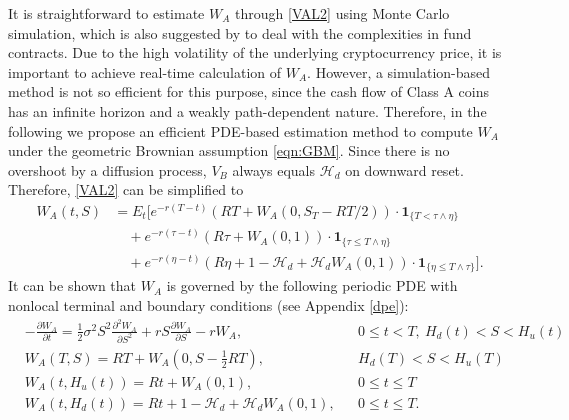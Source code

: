 \documentclass[11pt]{article}%
\numberwithin{equation}{section}
\theoremstyle{plain}
\begin{document}
 It is straightforward to estimate $W_A$ through \eqref{VAL2} using Monte Carlo simulation, which is also suggested by \cite{adams_risk_2006} to deal with the complexities in fund contracts. Due to the high volatility of the underlying cryptocurrency price, it is important to achieve real-time calculation of $W_A$. However, a simulation-based method is not so efficient for this purpose, since the cash flow of Class A coins has an infinite horizon and a weakly path-dependent nature. Therefore, in the following we propose an efficient PDE-based estimation method to compute $W_A$ under the geometric Brownian assumption \eqref{eqn:GBM}. Since there is no overshoot by a diffusion process, $V_B$ always equals $\mathcal{H}_d$ on downward reset. Therefore, \eqref{VAL2} can be simplified to
\begin{align} \nonumber
W_{A}(t,S) & =E_{t}\Bigg[e^{-r(T-t)}(RT+W_A(0,S_T-RT/2))\cdot\mathbf{1}_{\{T<\tau\land\eta\}}\\ \label{srep0}
&\quad+e^{-r(\tau-t)}(R\tau+W_{A}(0,1))\cdot\mathbf{1}_{\{\tau\le T\land\eta\}}\\
 & \quad+e^{-r(\eta-t)}(R\eta+1-\mathcal{H}_d+\mathcal{H}_d W_{A}(0,1))\cdot\mathbf{1}_{\{\eta\le T\land\tau\}}\Bigg]. \nonumber
\end{align}
It can be shown that $W_{A}$ is governed by the following periodic PDE with nonlocal terminal and boundary conditions (see Appendix \ref{dpe}):
\begin{align}\label{eqn:PDEstart}
&-\frac{\partial W_{A}}{\partial t} =\frac{1}{2}\sigma^{2}S^{2}\frac{\partial^{2}W_{A}}{\partial S^{2}}+r S\frac{\partial W_{A}}{\partial S}-r W_{A}, &&0\le t<T,~H_d(t)<S<H_u(t)\\\label{eqn:ter}
&W_{A}(T,S)  =RT+W_{A}(0,S-\frac{1}{2}RT),&&H_d(T)<S<H_u(T)\\\label{eqn:bound1}
&W_{A}(t,H_{u}(t))  =Rt+W_{A}(0,1),&&0\le t\le T\\\label{eqn:PDEend}
&W_{A}(t,H_d(t))  =Rt+1-\mathcal{H}_{d}+\mathcal{H}_{d}W_{A}(0,1),&&0\le t\le T.
\end{align}
\end{document}
